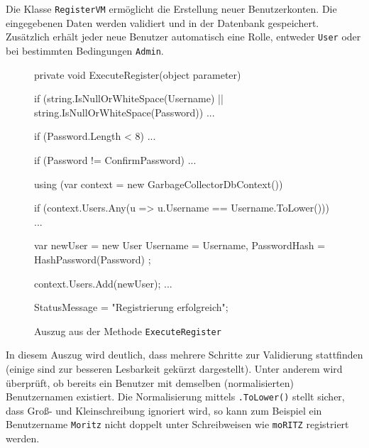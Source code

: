 Die Klasse \texttt{RegisterVM} ermöglicht die Erstellung neuer Benutzerkonten. Die eingegebenen Daten werden validiert und in der Datenbank gespeichert. Zusätzlich erhält jeder neue Benutzer automatisch eine Rolle, entweder \texttt{User} oder bei bestimmten Bedingungen \texttt{Admin}.

\vspace{0.5em}

\begin{figure}[H]
    \centering
    \begin{cs}
private void ExecuteRegister(object parameter)
{
    if (string.IsNullOrWhiteSpace(Username) || string.IsNullOrWhiteSpace(Password)) { ... }

    if (Password.Length < 8) { ... }

    if (Password != ConfirmPassword) { ... }

    using (var context = new GarbageCollectorDbContext())
    {
        if (context.Users.Any(u => u.Username == Username.ToLower())) { ... }

        var newUser = new User
        {
            Username = Username,
            PasswordHash = HashPassword(Password)
        };

        context.Users.Add(newUser);
        ...
    }

    StatusMessage = "Registrierung erfolgreich";
}
\end{cs}
    \caption{Auszug aus der Methode \texttt{ExecuteRegister}}
\end{figure}

\vspace{0.5em}

In diesem Auszug wird deutlich, dass mehrere Schritte zur Validierung stattfinden (einige sind zur besseren Lesbarkeit gekürzt dargestellt). Unter anderem wird überprüft, ob bereits ein Benutzer mit demselben (normalisierten) Benutzernamen existiert. Die Normalisierung mittels \texttt{.ToLower()} stellt sicher, dass Groß- und Kleinschreibung ignoriert wird, so kann zum Beispiel ein Benutzername \texttt{Moritz} nicht doppelt unter Schreibweisen wie \texttt{moRITZ} registriert werden.
